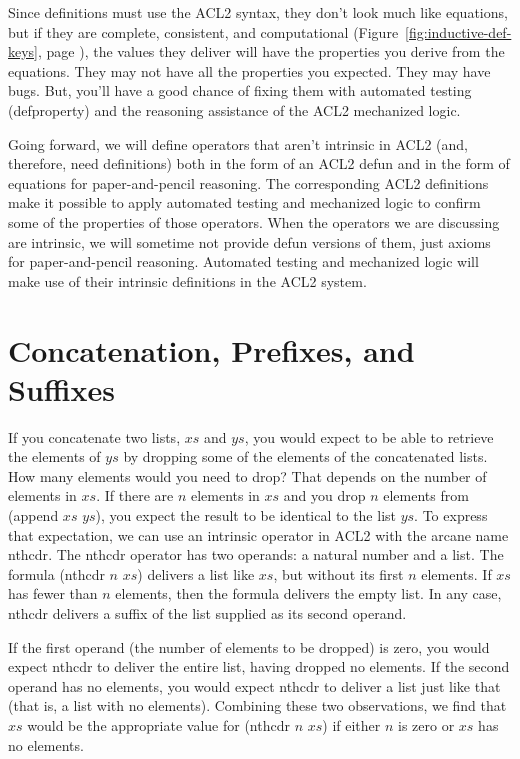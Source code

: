 Since definitions must use the ACL2 syntax,
they don't look much like equations,
but if they are complete, consistent, and computational
(Figure~\ref{fig:inductive-def-keys}, page \pageref{fig:inductive-def-keys}),
the values they deliver will have the properties you derive
from the equations.
They may not have all the properties you expected.
They may have bugs.
But, you'll have a good chance of fixing them with
automated testing (\textsf{defproperty})
and the reasoning assistance of the ACL2 mechanized logic.

Going forward, we will define operators that aren't
intrinsic in ACL2 (and, therefore, need definitions)
both in the form of an ACL2 \textsf{defun}
and in the form of equations for paper-and-pencil reasoning.
The corresponding ACL2 definitions
make it possible to apply automated testing and mechanized logic
to confirm some of the properties of those operators.
When the operators we are discussing are intrinsic,
we will sometime not provide \textsf{defun} versions of them,
just axioms for paper-and-pencil reasoning.
Automated testing and mechanized logic will make use
of their intrinsic definitions in the ACL2 system.

\section{Concatenation, Prefixes, and Suffixes}
\label{sec:append-prefix-suffix}

If you concatenate two lists, $xs$ and $ys$,
you would expect to be able to retrieve the elements
of $ys$ by dropping some of the elements of the concatenated lists.
How many elements would you need to drop?
That depends on the number of elements in $xs$.
If there are $n$ elements in $xs$ and you drop $n$ elements
from \textsf{(append $xs$ $ys$)}, you expect the result to be identical
to the list $ys$. To express that expectation, we can use
an intrinsic operator in ACL2 with the arcane name \textsf{nthcdr}.
The \textsf{nthcdr} operator has two operands: a natural number and a list.
The formula \textsf{(nthcdr $n$ $xs$)} delivers a list like $xs$,
but without its first $n$ elements.
If $xs$ has fewer than $n$ elements,
then the formula delivers the empty list.
In any case, \textsf{nthcdr} delivers a suffix of the list
supplied as its second operand.

If the first operand (the number of elements to be dropped) is zero,
you would expect
\textsf{nthcdr} to deliver the entire list, having dropped no elements.
If the second operand has no elements,
you would expect
\textsf{nthcdr} to deliver a list just like that
(that is, a list with no elements).
Combining these two observations, we find that
$xs$ would be the appropriate value for \textsf{(nthcdr $n$ $xs$)}
if either $n$ is zero or $xs$ has no elements.

